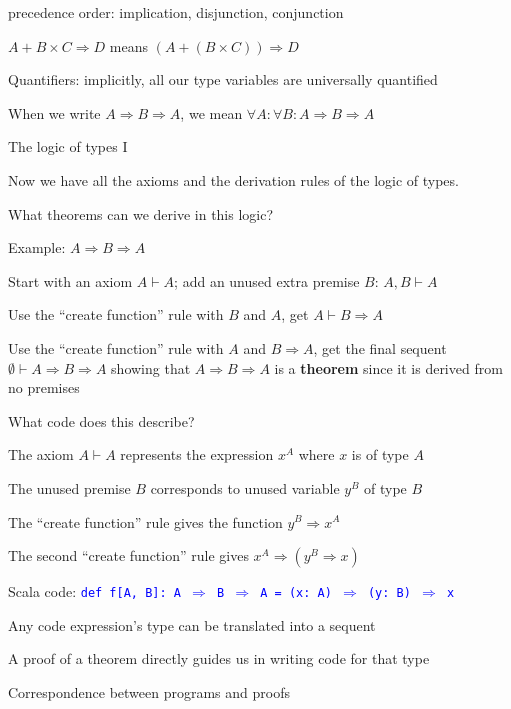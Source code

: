 precedence order: implication, disjunction, conjunction

$A+B\times C\Rightarrow D$ means $\left(A+\left(B\times C\right)\right)\Rightarrow D$

Quantifiers: implicitly, all our type variables are universally quantified

When we write $A\Rightarrow B\Rightarrow A$, we mean $\forall A:\forall B:A\Rightarrow B\Rightarrow A$

The logic of types I

Now we have all the axioms and the derivation rules of the logic of
types.

What theorems can we derive in this logic?

Example: $A\Rightarrow B\Rightarrow A$

Start with an axiom $A\vdash A$; add an unused extra premise $B$:
$A,B\vdash A$

Use the ``create function'' rule with $B$ and $A$, get $A\vdash B\Rightarrow A$

Use the ``create function'' rule with $A$ and $B\Rightarrow A$,
get the final sequent $\emptyset\vdash A\Rightarrow B\Rightarrow A$
showing that $A\Rightarrow B\Rightarrow A$ is a \textbf{theorem}
since it is derived from no premises

What code does this describe?

The axiom $A\vdash A$ represents the expression $x^{A}$ where $x$
is of type $A$

The unused premise $B$ corresponds to unused variable $y^{B}$ of
type $B$

The ``create function'' rule gives the function $y^{B}\Rightarrow x^{A}$

The second ``create function'' rule gives $x^{A}\Rightarrow\left(y^{B}\Rightarrow x\right)$

Scala code: \texttt{\textcolor{blue}{\footnotesize{}def f{[}A, B{]}:\ A
$\Rightarrow$ B $\Rightarrow$ A = (x:\ A) $\Rightarrow$ (y:\ B)
$\Rightarrow$ x}}{\footnotesize\par}

Any code expression's type can be translated into a sequent

A proof of a theorem directly guides us in writing code for that type

Correspondence between programs and proofs

